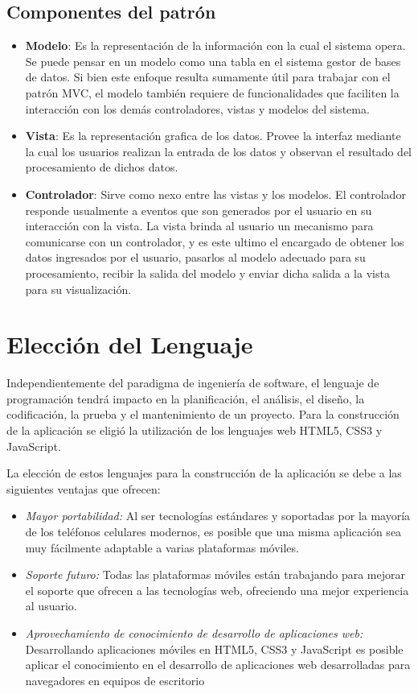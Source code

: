 \subsection{Componentes del patrón}
\begin{itemize}
    \item \textbf{Modelo}: Es la representación de la información con la cual el sistema opera. Se
    puede pensar en un modelo como una tabla en el sistema gestor de bases de datos.
    Si bien este enfoque resulta sumamente útil para trabajar con el patrón MVC,
    el modelo también requiere de funcionalidades que faciliten la interacción con los
    demás controladores, vistas y modelos del sistema.
    \item \textbf{Vista}: Es la representación grafica de los datos. Provee la interfaz mediante la cual
    los usuarios realizan la entrada de los datos y observan el resultado del procesamiento
    de dichos datos.
    \item \textbf{Controlador}: Sirve como nexo entre las vistas y los modelos. El controlador responde
    usualmente a eventos que son generados por el usuario en su interacción con
    la vista. La vista brinda al usuario un mecanismo para comunicarse con un controlador,
    y es este ultimo el encargado de obtener los datos ingresados por el usuario,
    pasarlos al modelo adecuado para su procesamiento, recibir la salida del modelo y
    enviar dicha salida a la vista para su visualización.
    
\end{itemize}



\section{Elección del Lenguaje}

    Independientemente del paradigma de ingeniería de software, el lenguaje de programación tendrá impacto en la planificación, el análisis, el diseño, la codificación, la prueba y el mantenimiento de un proyecto. Para la construcción de la aplicación se eligió la utilización de los lenguajes web HTML5, CSS3 y JavaScript.

    La elección de estos lenguajes para la construcción de la aplicación se debe a las siguientes ventajas que ofrecen:
    \begin{itemize}
        \item \emph{Mayor portabilidad:} Al ser tecnologías estándares y soportadas por la mayoría de los teléfonos celulares modernos, es posible que una misma aplicación sea muy fácilmente adaptable a varias plataformas móviles.
        \item \emph{Soporte futuro:} Todas las plataformas móviles están trabajando para mejorar el soporte que ofrecen a las tecnologías web, ofreciendo una mejor experiencia al usuario.
        \item \emph{Aprovechamiento de conocimiento de desarrollo de aplicaciones web:} Desarrollando aplicaciones móviles en \gls{HTML}5, \gls{CSS}3 y \gls{JavaScript} es posible aplicar el conocimiento en el desarrollo de aplicaciones web desarrolladas para navegadores en equipos de escritorio 
    \end{itemize}

